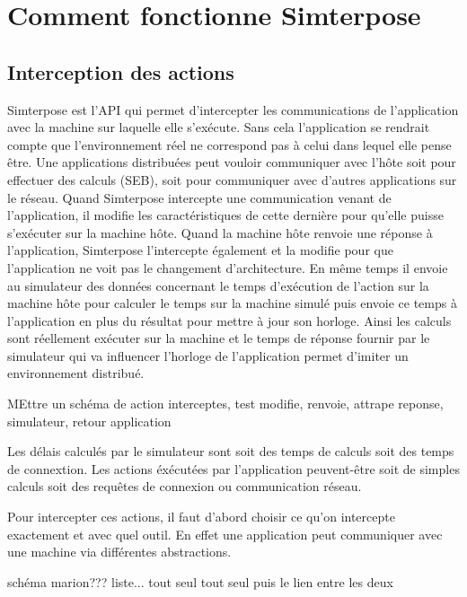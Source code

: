 \section{Comment fonctionne Simterpose}
\subsection{Interception des actions}
Simterpose est l'API qui permet d'intercepter les communications de
l'application avec la machine sur laquelle elle s'exécute. Sans cela
l'application se rendrait compte que l'environnement réel ne correspond pas à
celui dans lequel elle pense être. Une applications distribuées peut vouloir
communiquer avec l'hôte soit pour effectuer des calculs (SEB), soit pour
communiquer avec d'autres applications sur le réseau. Quand Simterpose
intercepte une communication venant de l'application, il modifie les
caractéristiques de cette dernière pour qu'elle puisse s'exécuter sur la machine
hôte. Quand la machine hôte renvoie une réponse à l'application, Simterpose
l'intercepte également et la modifie pour que l'application ne voit pas le
changement d'architecture. En même temps il envoie au simulateur des données
concernant le temps d'exécution de l'action sur la machine hôte pour calculer le
temps sur la machine simulé puis envoie ce temps à l'application en plus du
résultat pour mettre à jour son horloge. Ainsi les calculs sont réellement
exécuter sur la machine et le temps de réponse fournir par le simulateur qui va
influencer l'horloge de l'application permet d'imiter un environnement
distribué.

{\color{red} MEttre un schéma de action interceptes, test modifie, renvoie,
  attrape reponse, simulateur, retour application}

Les délais calculés par le simulateur sont soit des temps de calculs soit des
temps de connextion. Les actions éxécutées par l'application peuvent-être soit
de simples calculs soit des requêtes de connexion ou communication réseau.

Pour intercepter ces actions, il faut d'abord choisir ce qu'on intercepte
exactement et avec quel outil. En effet une application peut communiquer avec
une machine via différentes abstractions.

{\color{red} schéma marion???} liste... tout seul tout seul puis le lien entre
les deux

